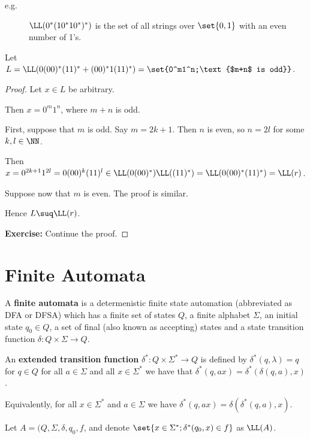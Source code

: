 \documentclass[11pt]{scrartcl}
\begin{document}
\begin{description}

\item[e.g.] $\LL(0^{*}(10^{*}10^{*})^{*})$ is the set of all strings over $\set{0, 1}$ with an even number of 1's.
\end{description}

\begin{claim*}
  Let $ L =\LL(0(00)^{*}(11)^{*} +(00)^{*}1(11)^{*}) = \set{0^m1^n;\text{$m+n$ is odd}}$.
\end{claim*}

\begin{proof}
  \hfill

  Let $x\in L$ be arbitrary.

  Then $x=0^m1^n$, where $m+n$ is odd.

  First, suppose that $m$ is odd. Say $m = 2k+1$. Then $n$ is even, so
  $n = 2 l$ for some $k, l \in \NN$.

  Then $x=0^{2k+1}1^{2l} = 0 (00)^k(11)^l \in \LL(0(00)^{*})\*\LL((11)^{*}) = \LL(0(00)^{*}\*(11)^{*}) = \LL(r)$.

  Suppose now that $m$ is even. The proof is similar.

  Hence $L \suq \LL(r)$.

  \textbf{Exercise:} Continue the proof.
\end{proof}

\section{Finite Automata}

A \textbf{finite automata} is a determenistic finite state automation
(abbreviated as DFA or DFSA) which has a finite set of states $Q$, a
finite alphabet $\Sigma$, an initial state $q_0\in Q$, a set of final
(also known as accepting) states and a state transition function
$\delta:Q\times \Sigma \to Q$.

An \textbf{extended transition function} $\delta^{*}: Q \times \Sigma^{*}\to Q$ is defined by $\delta^{*}(q, \lambda) =q$ for $q\in Q$ for all $a\in \Sigma$ and all $x\in \Sigma^{*}$ we have that $\delta^{*}(q, ax)= \delta^{*}(\delta(q, a), x)$.

Equivalently, for all $x\in \Sigma^{*}$ and $a\in \Sigma$ we have $\delta^{*}(q, ax) = \delta(\delta^{*}(q, a), x)$.

Let $A = (Q, \Sigma, \delta, q_0, f$, and denote
$\set{x\in\Sigma^{*};\delta^{*}(q_0, x)\in f}$ as $\LL(A)$.
\end{document}
